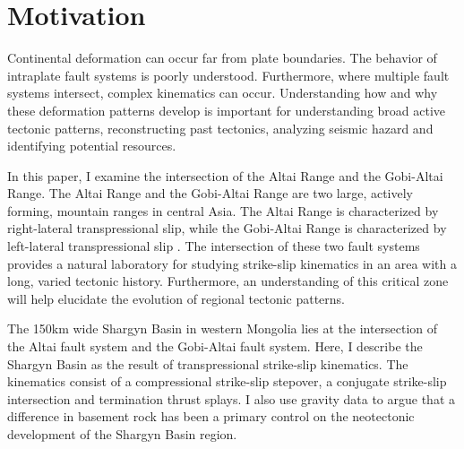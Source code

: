 \section{Motivation}
	Continental deformation can occur far from plate boundaries. The behavior of intraplate fault systems is poorly understood. Furthermore, where multiple fault systems intersect, complex kinematics can occur. Understanding how and why these deformation patterns develop is important for understanding broad active tectonic patterns, reconstructing past tectonics, analyzing seismic hazard and identifying potential resources. 

	In this paper, I examine the intersection of the Altai Range and the Gobi-Altai Range. The Altai Range and the Gobi-Altai Range are two large, actively forming, mountain ranges in central Asia. The Altai Range is characterized by right-lateral transpressional slip, while the Gobi-Altai Range is characterized by left-lateral transpressional slip \citep{Cunningham2005a}\citep{Cunningham2010}. The intersection of these two fault systems provides a natural laboratory for studying strike-slip kinematics in an area with a long, varied tectonic history. Furthermore, an understanding of this critical zone will help elucidate the evolution of regional tectonic patterns.
	

	The 150km wide Shargyn Basin in western Mongolia lies at the intersection of the Altai fault system and the Gobi-Altai fault system. Here, I describe the Shargyn Basin as the result of transpressional strike-slip kinematics. The kinematics consist of a compressional strike-slip stepover, a conjugate strike-slip intersection and termination thrust splays. I also use gravity data to argue that a difference in basement rock has been a primary control on the neotectonic development of the Shargyn Basin region.


